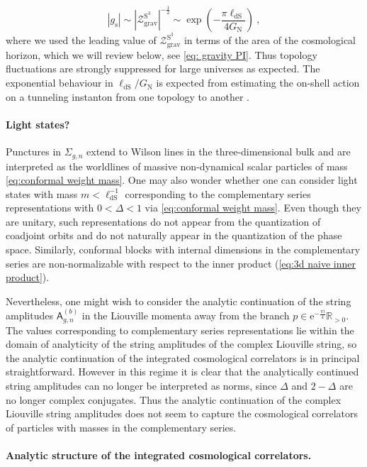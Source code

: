 \documentclass[12pt,a4paper]{article}
\newcommand{\be}{\begin{equation}}
\newcommand{\ee}{\end{equation}}
\begin{document}
\be 
|g_\text{s}|\sim |\mathcal{Z}^{\text{S}^3}_\text{grav}|^{-\frac{1}{2}} \sim \exp\left(-\frac{\pi \ell_{\text{dS}}}{4G_\text{N}}\right)~,
\ee
where we used the leading value of $\mathcal{Z}_{\text{grav}}^{\text{S}^3}$ in terms of the area of the cosmological horizon, which we will review below, see \eqref{eq: gravity PI}.
Thus topology fluctuations are strongly suppressed for large universes as expected. The exponential behaviour in $\ell_\text{dS}/G_\text{N}$ is expected from estimating the on-shell action on a tunneling instanton from one topology to another \cite{Coleman:1980aw, Anninos:2012qw}.



\paragraph{Light states?} Punctures in $\Sigma_{g,n}$ extend to Wilson lines in the three-dimensional bulk and are interpreted as the worldlines of massive non-dynamical scalar particles of mass \eqref{eq:conformal weight mass}. One may also wonder whether one can consider light states with mass $m<\ell_{\text{dS}}^{-1}$ corresponding to the complementary series representations with $0<\Delta<1$ via \eqref{eq:conformal weight mass}. 
Even though they are unitary, such representations do not appear from the quantization of coadjoint orbits and do not naturally appear in the quantization of the phase space. Similarly, conformal blocks with internal dimensions in the complementary series are non-normalizable with respect to the inner product (\ref{eq:3d naive inner product}).

Nevertheless, one might wish to consider the analytic continuation of the string amplitudes $\mathsf{A}_{g,n}^{(b)}$ in the Liouville momenta away from the branch $p\in \mathrm{e}^{-\frac{\pi i}{4}}\mathbb{R}_{>0}$. The  values corresponding to complementary series representations lie within the domain of analyticity of the string amplitudes of the complex Liouville string, so the analytic continuation of the integrated cosmological correlators is in principal straightforward. However in this regime it is clear that the analytically continued string amplitudes can no longer be interpreted as norms, since $\Delta$ and $2-\Delta$ are no longer complex conjugates. Thus the analytic continuation of the complex Liouville string amplitudes does not seem to capture the cosmological correlators of particles with masses in the complementary series. 
\paragraph{Analytic structure of the integrated cosmological correlators.}
\end{document}
